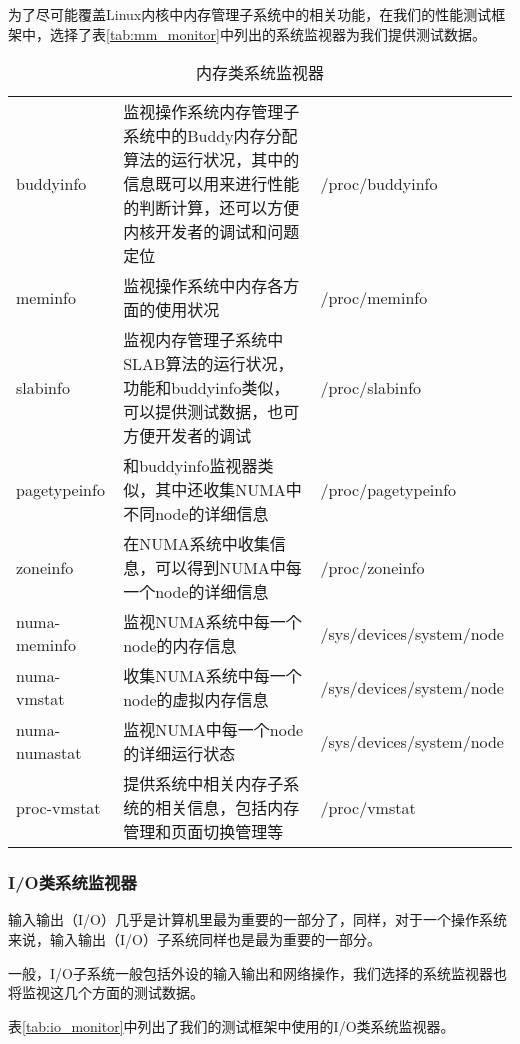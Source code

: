 为了尽可能覆盖Linux内核中内存管理子系统中的相关功能，在我们的性能测试框架中，选择了表\ref{tab:mm_monitor}中列出的系统监视器为我们提供测试数据。

\begin{table}[tbp]
\centering  %
\tabletail{\hline}

\begin{supertabular}{p{3cm}p{7cm}p{3cm}}
buddyinfo & 监视操作系统内存管理子系统中的Buddy内存分配算法的运行状况，其中的信息既可以用来进行性能的判断计算，还可以方便内核开发者的调试和问题定位 & /proc/buddyinfo\\
meminfo & 监视操作系统中内存各方面的使用状况 & /proc/meminfo\\
slabinfo & 监视内存管理子系统中SLAB算法的运行状况，功能和buddyinfo类似，可以提供测试数据，也可方便开发者的调试 & /proc/slabinfo\\
pagetypeinfo & 和buddyinfo监视器类似，其中还收集NUMA中不同node的详细信息 & /proc/pagetypeinfo\\
zoneinfo & 在NUMA系统中收集信息，可以得到NUMA中每一个node的详细信息 & /proc/zoneinfo\\
numa-meminfo & 监视NUMA系统中每一个node的内存信息 & /sys/devices/system/node\\
numa-vmstat & 收集NUMA系统中每一个node的虚拟内存信息 & /sys/devices/system/node\\
numa-numastat & 监视NUMA中每一个node的详细运行状态 & /sys/devices/system/node\\
proc-vmstat & 提供系统中相关内存子系统的相关信息，包括内存管理和页面切换管理等 &/proc/vmstat\\
\end{supertabular}
\caption{内存类系统监视器}
\label{tab:mem_monitor}
\end{table}



\subsubsection{I/O类系统监视器}

输入输出（I/O）几乎是计算机里最为重要的一部分了，同样，对于一个操作系统来说，输入输出（I/O）子系统同样也是最为重要的一部分。

一般，I/O子系统一般包括外设的输入输出和网络操作，我们选择的系统监视器也将监视这几个方面的测试数据。

表\ref{tab:io_monitor}中列出了我们的测试框架中使用的I/O类系统监视器。


